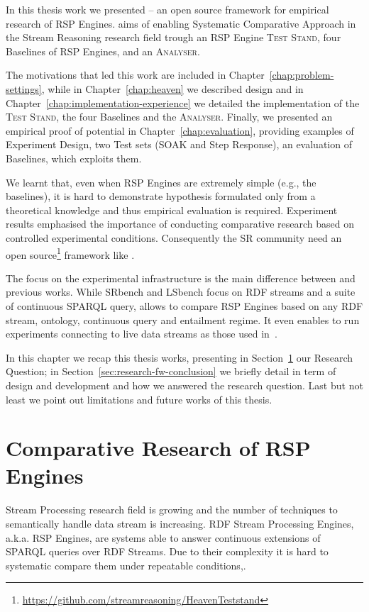 In this thesis work we presented \name -- an open source framework for empirical research of RSP Engines. \name aims of enabling Systematic Comparative Approach in the Stream Reasoning research field trough an RSP Engine \textsc{Test Stand}, four Baselines of RSP Engines, and an \textsc{Analyser}. 

The motivations that led this work are included in Chapter~\ref{chap:problem-settings}, while in Chapter~\ref{chap:heaven} we described \name design and in Chapter~\ref{chap:implementation-experience} we detailed the implementation of the \textsc{Test Stand}, the four Baselines and the \textsc{Analyser}. Finally, we presented an empirical proof of \name potential in Chapter~\ref{chap:evaluation}, providing examples of Experiment Design, two Test sets (SOAK and Step Response), an evaluation of \name Baselines, which exploits them.

We learnt that, even when RSP Engines are extremely simple (e.g., the baselines), it is hard to demonstrate hypothesis formulated only from a theoretical knowledge and thus empirical evaluation is required. Experiment results emphasised the importance of conducting comparative research based on controlled experimental conditions. Consequently the SR community need an open source\footnote{\url{https://github.com/streamreasoning/HeavenTeststand}} framework like \namens.

The focus on the experimental infrastructure is the main difference between \name and previous works. While SRbench and LSbench focus on RDF streams and a suite of continuous SPARQL query, \name allows to compare RSP Engines based on any RDF stream, ontology, continuous query and entailment regime. It even enables to run experiments connecting to live data streams as those used in~\cite{DBLP:conf/semweb/BalduiniVDTPC13}.	

In this chapter we recap this thesis works, presenting in Section~\ref{sec:research-question-conclusion} our Research Question; in Section~\ref{sec:research-fw-conclusion} we briefly detail \namens in term of design and development and how we answered the research question. Last but not least we point out \name limitations and future works of this thesis.

\section{Comparative Research of RSP Engines}\label{sec:research-question-conclusion}

Stream Processing research field is growing and the number of techniques to semantically handle data stream is increasing. RDF Stream Processing Engines, a.k.a. RSP Engines, are systems able to answer continuous extensions of SPARQL queries over RDF Streams. Due to their complexity it is hard to systematic compare them under repeatable conditions,. 

